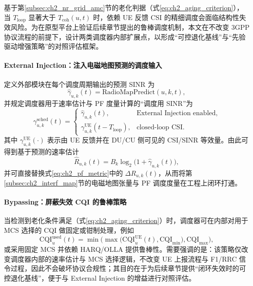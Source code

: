 \documentclass[type=master]{fduthesis}
\begin{document}
基于第\ref{subsec:ch2_nr_grid_amc}节的老化判据（式\eqref{eq:ch2_aging_criterion}），当 $T_{\mathrm{loop}}$ 显著大于 $T_{\mathrm{coh}}(u,t)$ 时，依赖 UE 反馈 CSI 的精细调度会面临结构性失效风险。为在原型平台上验证后续章节提出的鲁棒调度机制，本文在不改变 3GPP 协议流程的前提下，设计两类调度器内部扩展点，以形成“可控退化基线”与“先验驱动增强策略”的对照评估框架。

\paragraph{External Injection：注入电磁地图预测的调度输入}
定义外部模块在每个调度周期输出的预测 SINR 为
\begin{equation}
\hat{\gamma}_{u,k}(t)=\text{RadioMapPredict}(u,k,t),
\label{eq:ch2_hatgamma}
\end{equation}
并规定调度器用于速率估计与 PF 度量计算的“调度用 SINR”为
\begin{equation}
\gamma^{\mathrm{sched}}_{u,k}(t)=
\begin{cases}
\hat{\gamma}_{u,k}(t), & \text{External Injection enabled},\\
\gamma^{\mathrm{UE}}_{u,k}(t-T_{\mathrm{loop}}), & \text{closed-loop CSI}.
\end{cases}
\label{eq:ch2_gamma_sched}
\end{equation}
其中 $\gamma^{\mathrm{UE}}_{u,k}(\cdot)$ 表示由 UE 反馈并在 DU/CU 侧可见的 CSI/SINR 等效量。由此可得到基于预测的速率估计
\begin{equation}
\hat{R}_{u,k}(t)=B_k\log_2\!\bigl(1+\hat{\gamma}_{u,k}(t)\bigr),
\label{eq:ch2_hatR}
\end{equation}
并可直接替换式\eqref{eq:ch2_pf_metric}中的 $\Delta R_{u,k}(t)$，从而将第\ref{subsec:ch2_interf_map}节的电磁地图张量与 PF 调度度量在工程上闭环打通。

\paragraph{Bypassing：屏蔽失效 CQI 的鲁棒策略}
当检测到老化条件满足（式\eqref{eq:ch2_aging_criterion}）时，调度器可在内部对用于 MCS 选择的 CQI 做固定或钳制处理，例如
\begin{equation}
\mathrm{CQI}^{\mathrm{used}}_{u}(t)=
\min\!\Big(\max\big(\mathrm{CQI}^{\mathrm{UE}}_{u}(t),\mathrm{CQI}_{\min}\big),\mathrm{CQI}_{\max}\Big),
\label{eq:ch2_cqi_clamp}
\end{equation}
或采用固定 MCS 并依赖 HARQ/OLLA 提供鲁棒性。需要强调的是：该策略仅改变调度器内部的速率估计与 MCS 选择逻辑，不改变 UE 上报流程与 F1/RRC 信令过程，因此不会破坏协议合规性；其目的在于为后续章节提供“闭环失效时的可控退化基线”，便于与 External Injection 的增益进行对照评估。
\end{document}

